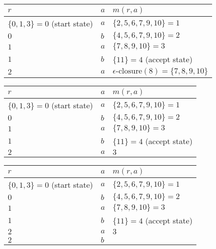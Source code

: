 \documentclass[8pt,a4paper,compress]{beamer}
\begin{document}
\begin{frame}[fragile]
\begin{overprint}
\begin{center}
\begin{tabular}{|C{4cm}|C{.5cm}|C{4cm}|} \hline
$r$ & $a$ & $m(r, a)$ \\ \hline \hline
$\{0, 1, 3\} = 0$ (start state) & $a$ &  $\{2, 5, 6, 7, 9, 10\} = 1$ \\ \hline
$0$ & $b$ & $\{4, 5, 6, 7, 9, 10\} = 2$  \\ \hline
$1$ & $a$ & $\{7, 8, 9, 10\} = 3$  \\ \hline
$1$ & $b$ & $\{11\} = 4$ (accept state)  \\ \hline
$2$ & $a$ & $\epsilon\text{-closure}(8) = \{7, 8, 9, 10\}$ \\ \hline
\end{tabular}
\end{center}

\begin{center}
\begin{tabular}{|C{4cm}|C{.5cm}|C{4cm}|} \hline
$r$ & $a$ & $m(r, a)$ \\ \hline \hline
$\{0, 1, 3\} = 0$ (start state) & $a$ &  $\{2, 5, 6, 7, 9, 10\} = 1$ \\ \hline
$0$ & $b$ & $\{4, 5, 6, 7, 9, 10\} = 2$  \\ \hline
$1$ & $a$ & $\{7, 8, 9, 10\} = 3$  \\ \hline
$1$ & $b$ & $\{11\} = 4$ (accept state) \\ \hline
$2$ & $a$ & $3$ \\ \hline
\end{tabular}
\end{center}

\begin{center}
\begin{tabular}{|C{4cm}|C{.5cm}|C{4cm}|} \hline
$r$ & $a$ & $m(r, a)$ \\ \hline \hline
$\{0, 1, 3\} = 0$ (start state) & $a$ &  $\{2, 5, 6, 7, 9, 10\} = 1$ \\ \hline
$0$ & $b$ & $\{4, 5, 6, 7, 9, 10\} = 2$  \\ \hline
$1$ & $a$ & $\{7, 8, 9, 10\} = 3$  \\ \hline
$1$ & $b$ & $\{11\} = 4$ (accept state) \\ \hline
$2$ & $a$ & $3$ \\ \hline
$2$ & $b$ &  \\ \hline
\end{tabular}
\end{center}


\end{overprint}
\end{frame}
\end{document}
